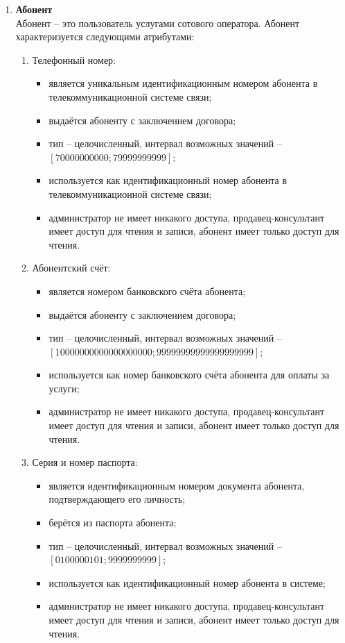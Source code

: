 \begin{enumerate}
    \item \textbf{Абонент} \\
    Абонент -- это пользователь услугами сотового оператора. Абонент характеризуется следующими атрибутами:
    \begin{enumerate}
        \item Телефонный номер:
        \begin{itemize}
            \item является уникальным идентификационным номером абонента в телекоммуникационной системе связи;
            \item выдаётся абоненту с заключением договора;
            \item тип -- целочисленный, интервал возможных значений -- $[70000000000; 79999999999]$;
            \item используется как идентификационный номер абонента в телекоммуникационной системе связи;
            \item администратор не имеет никакого доступа, продавец-консультант имеет доступ для чтения и записи, абонент имеет только доступ для чтения.
        \end{itemize}

        \item Абонентский счёт:
        \begin{itemize}
            \item является номером банковского счёта абонента;
            \item выдаётся абоненту с заключением договора;
            \item тип -- целочисленный, интервал возможных значений -- $[10000000000000000000; 99999999999999999999]$;
            \item используется как номер банковского счёта абонента для оплаты за услуги;
            \item администратор не имеет никакого доступа, продавец-консультант имеет доступ для чтения и записи, абонент имеет только доступ для чтения.
        \end{itemize}

        \item Серия и номер паспорта:
        \begin{itemize}
            \item является идентификационным номером документа абонента, подтверждающего его личность;
            \item берётся из паспорта абонента;
            \item тип -- целочисленный, интервал возможных значений -- $[0100000101; 9999999999]$;
            \item используется как идентификационный номер абонента в системе;
            \item администратор не имеет никакого доступа, продавец-консультант имеет доступ для чтения и записи, абонент имеет только доступ для чтения.
        \end{itemize}


\end{enumerate}
\end{enumerate}
